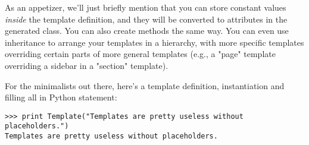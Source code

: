 As an appetizer, we'll just briefly mention that you can store constant values
{\em inside} the template definition, and they will be converted to attributes
in the generated class.  You can also create methods the same way.
You can even use inheritance to arrange your templates in a hierarchy,
with more specific templates overriding certain parts of more general
templates (e.g., a "page" template overriding a sidebar in a "section"
template).

For the minimalists out there, here's a template definition,
instantiation and filling all in Python statement:

\begin{verbatim}
>>> print Template("Templates are pretty useless without placeholders.")
Templates are pretty useless without placeholders.
\end{verbatim}



